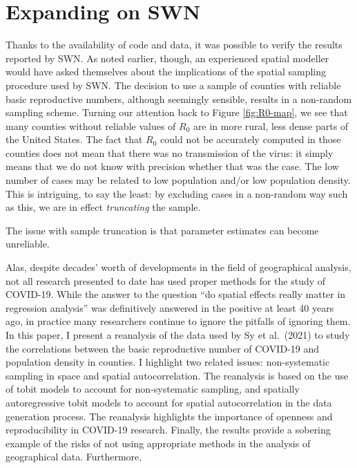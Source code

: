 \documentclass[10pt,letterpaper]{article}
\begin{document}
\hypertarget{expanding-on-swn}{%
\section{Expanding on SWN}\label{expanding-on-swn}}

Thanks to the availability of code and data, it was possible to verify
the results reported by SWN. As noted earlier, though, an experienced
spatial modeller would have asked themselves about the implications of
the spatial sampling procedure used by SWN. The decision to use a sample
of counties with reliable basic reproductive numbers, although seemingly
sensible, results in a non-random sampling scheme. Turning our attention
back to Figure \ref{fig:R0-map}, we see that many counties without
reliable values of \(R_0\) are in more rural, less dense parts of the
United States. The fact that \(R_0\) could not be accurately computed in
those counties does not mean that there was no transmission of the
virus: it simply means that we do not know with precision whether that
was the case. The low number of cases may be related to low population
and/or low population density. This is intriguing, to say the least: by
excluding cases in a non-random way such as this, we are in effect
\emph{truncating} the sample.

The issue with sample truncation is that parameter estimates can become
unreliable.

Alas, despite decades' worth of developments in the field of
geographical analysis, not all research presented to date has used
proper methods for the study of COVID-19. While the answer to the
question ``do spatial effects really matter in regression analysis'' was
definitively answered in the positive at least 40 years ago, in practice
many researchers continue to ignore the pitfalls of ignoring them. In
this paper, I present a reanalysis of the data used by Sy et al.~(2021)
to study the correlations between the basic reproductive number of
COVID-19 and population density in counties. I highlight two related
issues: non-systematic sampling in space and spatial autocorrelation.
The reanalysis is based on the use of tobit models to account for
non-systematic sampling, and spatially autoregressive tobit models to
account for spatial autocorrelation in the data generation process. The
reanalysis highlights the importance of openness and reproducibility in
COVID-19 research. Finally, the results provide a sobering example of
the risks of not using appropriate methods in the analysis of
geographical data. Furthermore,
\end{document}
